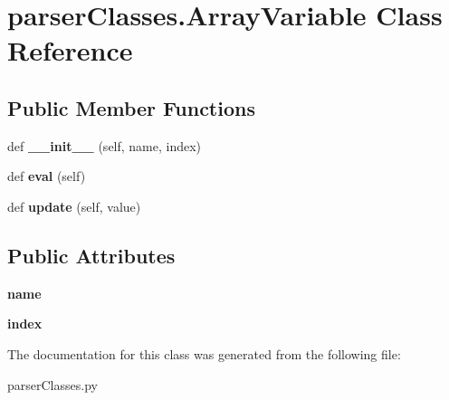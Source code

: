 \hypertarget{classparser_classes_1_1_array_variable}{}\section{parser\+Classes.\+Array\+Variable Class Reference}
\label{classparser_classes_1_1_array_variable}
\subsection*{Public Member Functions}
\begin{DoxyCompactItemize}
\item 
\mbox{\label{classparser_classes_1_1_array_variable_afb6239db909b44d7ad42b79f1d89786d}} 
def {\bfseries \+\_\+\+\_\+init\+\_\+\+\_\+} (self, name, index)
\item 
\mbox{\label{classparser_classes_1_1_array_variable_a6c61b9b50fcaa606cc08af21d7f5778d}} 
def {\bfseries eval} (self)
\item 
\mbox{\label{classparser_classes_1_1_array_variable_ae8068e5174714d900498f024a7933dca}} 
def {\bfseries update} (self, value)
\end{DoxyCompactItemize}
\subsection*{Public Attributes}
\begin{DoxyCompactItemize}
\item 
\mbox{\label{classparser_classes_1_1_array_variable_ad2e8e2f71b9333f55813166ae953e12e}} 
{\bfseries name}
\item 
\mbox{\label{classparser_classes_1_1_array_variable_a3a084b5d13c1e75b841842fe5bbf04c6}} 
{\bfseries index}
\end{DoxyCompactItemize}


The documentation for this class was generated from the following file\+:\begin{DoxyCompactItemize}
\item 
parser\+Classes.\+py\end{DoxyCompactItemize}
